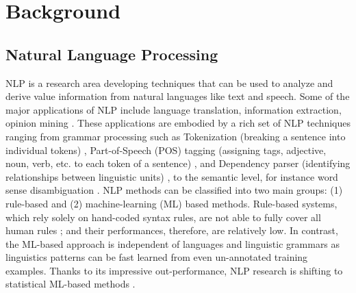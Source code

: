 \documentclass[Journal, BackFigs, DoubleSpace]{ascelike}%
\begin{document}
% 
\section{Background} \label{sec:litrev} %
%
\subsection{Natural Language Processing}
NLP is a research area developing techniques that can be used to analyze and derive value information from natural languages like text and speech. Some of the major applications of NLP include language translation, information extraction, opinion mining \cite{Cambria14}. These applications are embodied by a rich set of NLP techniques ranging from grammar processing such as Tokenization (breaking a sentence into individual tokens) \cite{Webster92,Zhao11},  Part-of-Speech (POS) tagging (assigning tags, adjective, noun, verb, etc. to each token of a sentence) \cite{Toutanova03,Cunningham02}, and Dependency parser (identifying relationships between linguistic units) \cite{chen14}, to the semantic level, for instance word sense disambiguation \cite{Lesk86,Yarowsky95,Navigli09}. NLP methods can be classified into two main groups: (1) rule-based and (2) machine-learning (ML) based methods. Rule-based systems, which rely solely on hand-coded syntax rules, are not able to fully cover all human rules \cite{Marcus95}; and their performances, therefore, are relatively low. In contrast, the ML-based approach is independent of languages and linguistic grammars \cite{costa-jussa12} as linguistics patterns can be fast learned from even un-annotated training examples. Thanks to its impressive out-performance, NLP research is shifting to statistical ML-based methods \cite{Cambria14}. 
%
\end{document}
